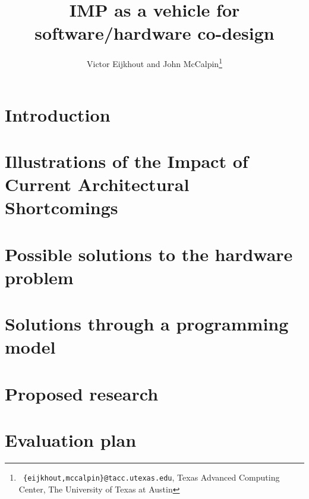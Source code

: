 \documentclass[11pt,fleqn,preprint]{impreport}
\title[Codesign and IMP]{IMP as a vehicle for software/hardware co-design}
\author[Eijkhout]{Victor Eijkhout and John McCalpin\thanks{{\tt
      \{eijkhout,mccalpin\}@tacc.utexas.edu}, Texas Advanced Computing
    Center, The University of Texas at Austin}}
\begin{document}
\maketitle

\begin{abstract}
  
\end{abstract}

\acresetall

\section{Introduction}


\section{Illustrations of the Impact of Current Architectural Shortcomings}
\label{sec:diagnosis}



\section{Possible solutions to the hardware problem}
\label{sec:sketch}


\section{Solutions through a programming model}
\label{sec:imp}




\section{Proposed research}
\label{sec:proposed}


\section{Evaluation plan}
\label{sec:eval}




\end{document}
